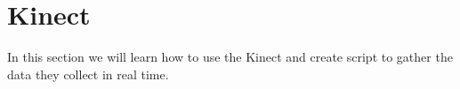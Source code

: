 \section{Kinect}

In this section we will learn how to use the Kinect and create script to gather the data they collect in real time.